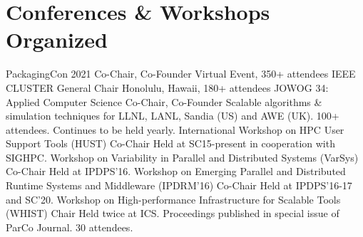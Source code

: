 \section{Conferences \& Workshops Organized}
            {PackagingCon 2021}
            {Co-Chair, Co-Founder}{}{}
            {Virtual Event, 350+ attendees}
            {IEEE CLUSTER}
            {General Chair}{}{}
            {Honolulu, Hawaii, 180+ attendees}
		{JOWOG 34: Applied Computer Science}
		{Co-Chair, Co-Founder}
		{}{}
		{Scalable algorithms \& simulation techniques for
		  LLNL, LANL, Sandia (US) and AWE (UK).  100+ attendees.\newline
                  Continues to be held yearly.
                }
		{International Workshop on HPC User Support Tools (HUST)}
		{Co-Chair}{}{}
		{Held at SC15-present in cooperation with SIGHPC.}
		{Workshop on Variability in Parallel and Distributed Systems (VarSys)}
		{Co-Chair}{}{}
		{Held at IPDPS'16.}
                {Workshop on Emerging Parallel and Distributed Runtime Systems and Middleware\newline
                 (IPDRM'16)}
		{Co-Chair}{}{}
		{Held at IPDPS'16-17 and SC'20.}
		{Workshop on High-performance Infrastructure for Scalable Tools (WHIST)}
		{Chair}{}{}
		{Held twice at ICS. Proceedings published in special issue of ParCo Journal. 30 attendees.}


